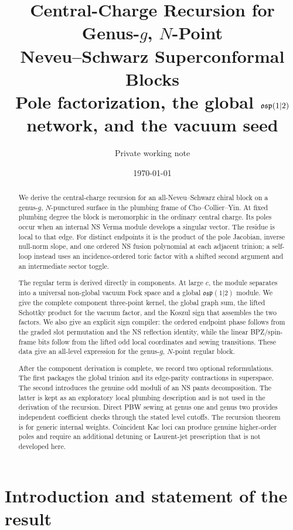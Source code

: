 \documentclass[11pt]{article}
\title{Central-Charge Recursion for Genus-\(g\), \(N\)-Point\\
Neveu--Schwarz Superconformal Blocks\\[0.35em]
\large Pole factorization, the global \(\osp\) network, and the vacuum seed}
\author{Private working note}
\date{\today}
\newcommand{\osp}{\mathfrak{osp}(1|2)}
\begin{document}
\maketitle

\begin{abstract}
We derive the central-charge recursion for an all-Neveu--Schwarz chiral
block on a genus-\(g\), \(N\)-punctured surface in the plumbing frame of
Cho--Collier--Yin.  At fixed plumbing degree the block is meromorphic in the
ordinary central charge.  Its poles occur when an internal NS Verma module
develops a singular vector.  The residue is local to that edge.  For distinct
endpoints it is the product of the pole Jacobian, inverse null-norm slope, and
one ordered NS fusion polynomial at each adjacent trinion; a self-loop instead
uses an incidence-ordered toric factor with a shifted second argument and an
intermediate sector toggle.

The regular term is derived directly in components.  At large \(c\), the
module separates into a universal non-global vacuum Fock space and a global
\(\osp\) module.  We give the complete component three-point kernel, the
global graph sum, the lifted Schottky product for the vacuum factor, and the
Koszul sign that assembles the two factors.  We also give an explicit sign
compiler: the ordered endpoint phase follows from the graded slot
permutation and the NS reflection identity, while the linear BPZ/spin-frame
bits follow from the lifted odd local coordinates and sewing transitions.
These data give an all-level expression for the genus-\(g\), \(N\)-point
regular block.

After the component derivation is complete, we record two optional
reformulations.  The first packages the global trinion and its edge-parity
contractions in superspace.  The second introduces the genuine odd moduli of
an NS pants decomposition.  The latter is kept as an exploratory local
plumbing description and is not used in the derivation of the recursion.
Direct PBW sewing at genus one and genus two provides independent
coefficient checks through the stated level cutoffs.  The recursion theorem
is for generic internal weights.  Coincident Kac loci can produce genuine
higher-order poles and require an additional detuning or Laurent-jet
prescription that is not developed here.
\end{abstract}

\tableofcontents

\section*{Introduction and statement of the result}
\end{document}
